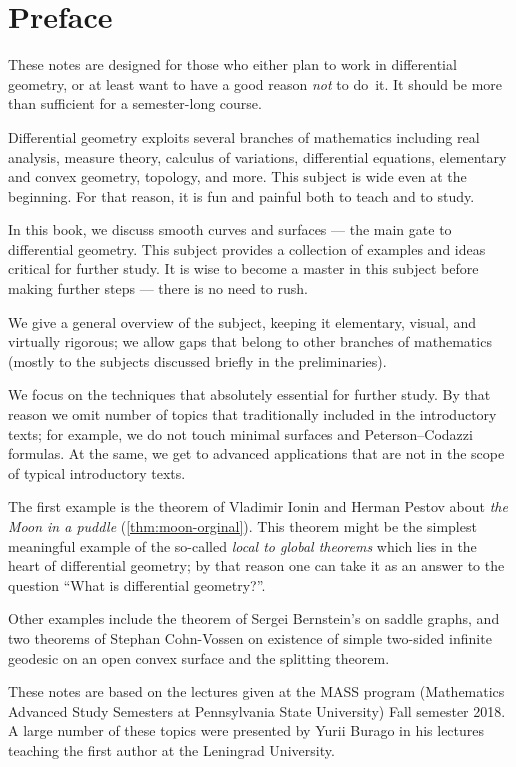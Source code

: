 
\chapter*{Preface}

These notes are designed for those who either plan to work in differential geometry,
or at least want to have a good reason \emph{not} to do~it.
It should be more than sufficient for a semester-long course. 

Differential geometry exploits several branches of mathematics including 
real analysis, 
measure theory,
calculus of variations,
differential equations,
elementary and convex geometry,
topology, and more.
This subject is wide even at the beginning. 
For that reason, it is fun and painful both to teach and to study.

In this book, we discuss smooth curves and surfaces --- the main gate to differential geometry.
This subject provides a collection of examples and ideas critical for further study.
It is wise to become a master in this subject before making further steps --- there is no need to rush.

We give a general overview of the subject, keeping it elementary, visual, and virtually rigorous; we allow gaps that belong to other branches of mathematics (mostly to the subjects discussed briefly in the preliminaries).

We focus on the techniques that absolutely essential for further study.
By that reason we omit number of topics that traditionally included in the introductory texts;
for example, we do not touch %
minimal surfaces and Peterson--Codazzi formulas.
At the same, we get to advanced applications
 that are not in the scope of typical introductory texts.
 
The first example is the theorem of Vladimir Ionin and Herman Pestov about \emph{the Moon in a puddle} (\ref{thm:moon-orginal}).
This theorem might be the simplest meaningful example of the so-called {}\emph{local to global theorems} which lies in the heart of differential geometry;
by that reason one can take it as an answer to the question ``What is differential geometry?''.

Other examples include the theorem of Sergei Bernstein's on saddle graphs, and two theorems of Stephan Cohn-Vossen on existence of simple two-sided infinite geodesic on an open convex surface and the splitting theorem.

These notes are based on the lectures given at the MASS program (Mathematics Advanced Study Semesters at Pennsylvania State University) Fall semester 2018.
A large number of these topics were presented by Yurii Burago in his lectures teaching the first author at the Leningrad University.


